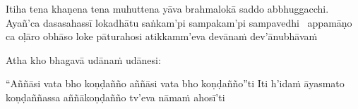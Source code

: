 \ifbfive\clearpage\fi

\begin{pali-hang}
  Itiha tena khaṇena tena muhuttena  yāva brahmalokā saddo abbhuggacchi. Ayañ'ca dasasahassī lokadhātu saṅkam'pi sampakam'pi sampavedhi \breathmark\ appamāṇo ca oḷāro obhāso loke pāturahosi atikkamm'eva devānaṁ dev'ānubhāvaṁ
\end{pali-hang}

Atha kho bhagavā udānaṁ udānesi:

\begin{pali-hang}
  ``Aññāsi vata bho koṇḍañño aññāsi vata bho koṇḍañño''ti Iti h'idaṁ āyasmato koṇḍaññassa aññākoṇḍañño tv'eva nāmaṁ ahosī'ti
\end{pali-hang}

\suttaRef{[SN 56.11]}

